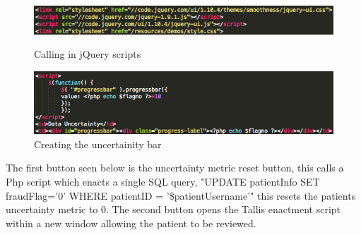 \documentclass[11pt]{article}
\begin{document}
\begin{figure}[h!] 
\includegraphics[width=\linewidth]{buttonscripts.png}
\caption{Calling in jQuery scripts \label{buttonscripts}}
\endminipage\hfill
{}
\includegraphics[width=\linewidth]{progressbar.png}
\caption{Creating the uncertainity bar \label{progressbar}}
\endminipage
\end{figure} 
The first button seen below is the uncertainty metric reset button, this calls a Php script which enacts a single SQL query, "UPDATE patientInfo SET fraudFlag='0' WHERE patientID = '\$patientUsername'" this resets the patients uncertainty metric to 0. The second button opens the Tallis enactment script within a new window allowing the patient to be reviewed.
\end{document}
